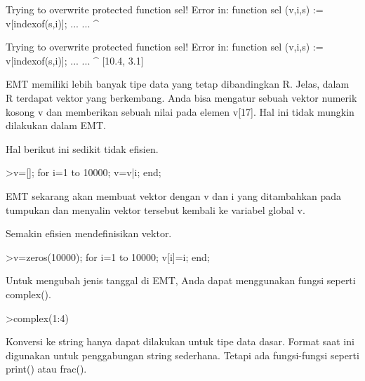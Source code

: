 \documentclass{article}
\begin{document}
\begin{eulernotebook}
\begin{euleroutput}
  Trying to overwrite protected function sel!
  Error in:
  function sel (v,i,s) := v[indexof(s,i)]; ... ...
               ^
  
  Trying to overwrite protected function sel!
  Error in:
  function sel (v,i,s) := v[indexof(s,i)]; ... ...
               ^
  [10.4,  3.1]
\end{euleroutput}
\begin{eulercomment}
EMT memiliki lebih banyak tipe data yang tetap dibandingkan R. Jelas,
dalam R terdapat vektor yang berkembang. Anda bisa mengatur sebuah
vektor numerik kosong v dan memberikan sebuah nilai pada elemen v[17].
Hal ini tidak mungkin dilakukan dalam EMT.

Hal berikut ini sedikit tidak efisien.
\end{eulercomment}
\begin{eulerprompt}
>v=[]; for i=1 to 10000; v=v|i; end;
\end{eulerprompt}
\begin{eulercomment}
EMT sekarang akan membuat vektor dengan v dan i yang ditambahkan pada
tumpukan dan menyalin vektor tersebut kembali ke variabel global v.

Semakin efisien mendefinisikan vektor.
\end{eulercomment}
\begin{eulerprompt}
>v=zeros(10000); for i=1 to 10000; v[i]=i; end;
\end{eulerprompt}
\begin{eulercomment}
Untuk mengubah jenis tanggal di EMT, Anda dapat menggunakan fungsi
seperti complex().
\end{eulercomment}
\begin{eulerprompt}
>complex(1:4)
\end{eulerprompt}
\begin{euleroutput}
  [ 1+0i ,  2+0i ,  3+0i ,  4+0i  ]
\end{euleroutput}
\begin{eulercomment}
Konversi ke string hanya dapat dilakukan untuk tipe data dasar. Format
saat ini digunakan untuk penggabungan string sederhana. Tetapi ada
fungsi-fungsi seperti print() atau frac().


\end{eulercomment}
\end{eulernotebook}
\end{document}
